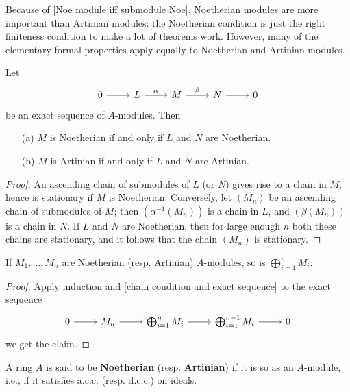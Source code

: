 Because of \cref{Noe module iff submodule Noe}, Noetherian modules are more important than Artinian modules: the Noetherian condition is just the right finiteness condition to make a lot of theorems work. However, many of the elementary formal properties apply equally to Noetherian and Artinian modules.
\begin{proposition}\label{chain condition and exact sequence}
Let 
\[\begin{tikzcd}
0\ar[r]&L\ar[r,"\alpha"]&M\ar[r,"\beta"]&N\ar[r]&0
\end{tikzcd}\]
be an exact sequence of $A$-modules. Then
\begin{itemize}
\item[(a)] $M$ is Noetherian if and only if $L$ and $N$ are Noetherian.
\item[(b)] $M$ is Artinian if and only if $L$ and $N$ are Artinian.
\end{itemize}
\end{proposition}
\begin{proof}
An ascending chain of submodules of $L$ (or $N$) gives rise to a chain in $M$, hence is stationary if $M$ is Noetherian. Conversely, let $(M_n)$ be an ascending chain of submodules of $M$; then $(\alpha^{-1}(M_n))$ is a chain in $L$, and $(\beta(M_n))$ is a chain in $N$. If $L$ and $N$ are Noetherian, then for large enough $n$ both these chains are stationary, and it follows that the chain $(M_n)$ is stationary.
\end{proof}
\begin{proposition}\label{Noe module sum}
If $M_1,\dots,M_n$ are Noetherian (resp. Artinian) $A$-modules, so is $\bigoplus_{i=1}^{n}M_i$.
\end{proposition}
\begin{proof}
Apply induction and \cref{chain condition and exact sequence} to the exact sequence
\[\begin{tikzcd}
0\ar[r]&M_n\ar[r]&\bigoplus_{i=1}^nM_i\ar[r]&\bigoplus_{i=1}^{n-1}M_i\ar[r]&0
\end{tikzcd}\]
we get the claim.
\end{proof}
A ring $A$ is said to be \textbf{Noetherian} (resp. \textbf{Artinian}) if it is so as an $A$-module, i.e., if it satisfies a.c.c. (resp. d.c.c.) on ideals.
